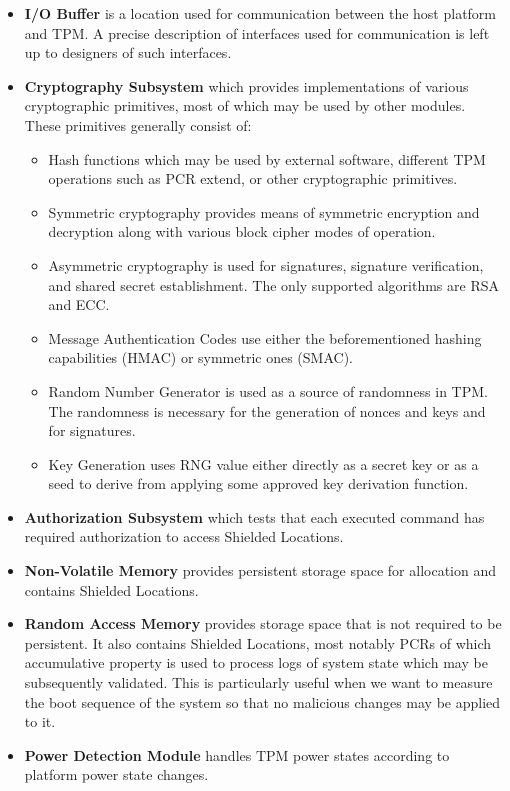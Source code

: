 \begin{itemize}

\item \textbf{I/O Buffer} is a location used for communication between the host platform and TPM. A precise description of interfaces used for communication is left up to designers of such interfaces.

\item \textbf{Cryptography Subsystem} which provides implementations of various cryptographic primitives, most of which may be used by other modules. These primitives generally consist of: 
\begin{itemize}
    \item Hash functions which may be used by external software, different TPM operations such as PCR extend, or other cryptographic primitives. 
    \item Symmetric cryptography provides means of symmetric encryption and decryption along with various block cipher modes of operation.
    \item Asymmetric cryptography is used for signatures, signature verification, and shared secret establishment. The only supported algorithms are RSA and ECC.
    \item Message Authentication Codes use either the beforementioned hashing capabilities (HMAC) or symmetric ones (SMAC).
    \item Random Number Generator is used as a source of randomness in TPM. The randomness is necessary for the generation of nonces and keys and for signatures. 
    \item Key Generation uses RNG value either directly as a secret key or as a seed to derive from applying some approved key derivation function.
\end{itemize}

\item \textbf{Authorization Subsystem} which tests that each executed command has required authorization to access Shielded Locations. 

\item \textbf{Non-Volatile Memory} provides persistent storage space for allocation and contains Shielded Locations.

\item \textbf{Random Access Memory} provides storage space that is not required to be persistent. It also contains Shielded Locations, most notably PCRs of which accumulative property is used to process logs of system state which may be subsequently validated. This is particularly useful when we want to measure the boot sequence of the system so that no malicious changes may be applied to it.

\item \textbf{Power Detection Module} handles TPM power states according to platform power state changes.
\end{itemize}

